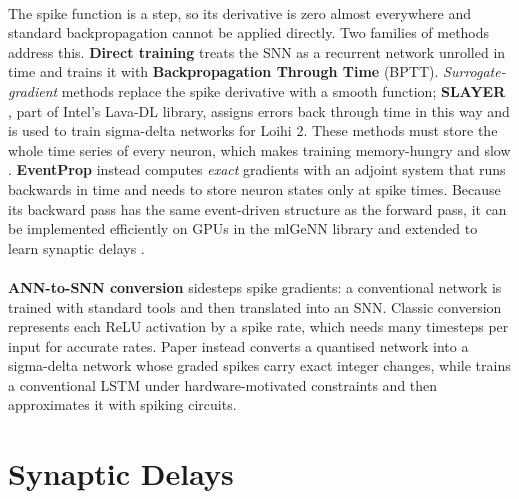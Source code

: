 \documentclass[12pt,a4paper,final]{extreport}
\begin{document}
\paragraph{} The spike function is a step, so its derivative is zero almost everywhere and standard backpropagation cannot be applied directly. Two families of methods address this. \textbf{Direct training} treats the SNN as a recurrent network unrolled in time and trains it with \textbf{Backpropagation Through Time} (BPTT). \emph{Surrogate-gradient} methods replace the spike derivative with a smooth function; \textbf{SLAYER} \cite{shrestha2018}, part of Intel's Lava-DL library, assigns errors back through time in this way and is used to train sigma-delta networks for Loihi 2. These methods must store the whole time series of every neuron, which makes training memory-hungry and slow \cite{p4}. \textbf{EventProp} \cite{wunderlich2021} instead computes \emph{exact} gradients with an adjoint system that runs backwards in time and needs to store neuron states only at spike times. Because its backward pass has the same event-driven structure as the forward pass, it can be implemented efficiently on GPUs in the mlGeNN library and extended to learn synaptic delays \cite{p1}.

\paragraph{} \textbf{ANN-to-SNN conversion} sidesteps spike gradients: a conventional network is trained with standard tools and then translated into an SNN. Classic conversion represents each ReLU activation by a spike rate, which needs many timesteps per input for accurate rates. Paper \cite{p4} instead converts a quantised network into a sigma-delta network whose graded spikes carry exact integer changes, while \cite{p3} trains a conventional LSTM under hardware-motivated constraints and then approximates it with spiking circuits.

\section{Synaptic Delays}
\end{document}
